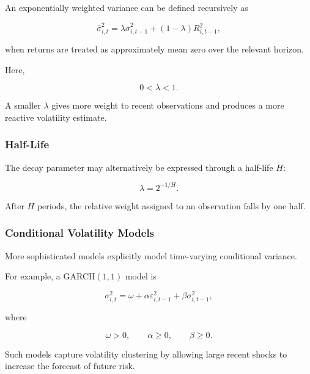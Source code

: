 \documentclass[11pt,a4paper]{article}
\begin{document}
An exponentially weighted variance can be defined recursively as

\begin{equation}
\boxed{
\widehat{\sigma}_{i,t}^{2}
=
\lambda
\widehat{\sigma}_{i,t-1}^{2}
+
(1-\lambda)
R_{i,t-1}^{2},
}
\end{equation}

when returns are treated as approximately mean zero over the relevant horizon.

Here,

\begin{equation}
0<\lambda<1.
\end{equation}

A smaller $\lambda$ gives more weight to recent observations and produces a
more reactive volatility estimate.


\subsubsection{Half-Life}

The decay parameter may alternatively be expressed through a half-life $H$:

\begin{equation}
\boxed{
\lambda
=
2^{-1/H}.
}
\end{equation}

After $H$ periods, the relative weight assigned to an observation falls by
one half.


\subsubsection{Conditional Volatility Models}

More sophisticated models explicitly model time-varying conditional variance.

For example, a GARCH$(1,1)$ model is

\begin{equation}
\boxed{
\sigma_{i,t}^{2}
=
\omega
+
\alpha
\varepsilon_{i,t-1}^{2}
+
\beta
\sigma_{i,t-1}^{2},
}
\end{equation}

where

\begin{equation}
\omega>0,
\qquad
\alpha\geq0,
\qquad
\beta\geq0.
\end{equation}

Such models capture volatility clustering by allowing large recent shocks to
increase the forecast of future risk.
\end{document}
